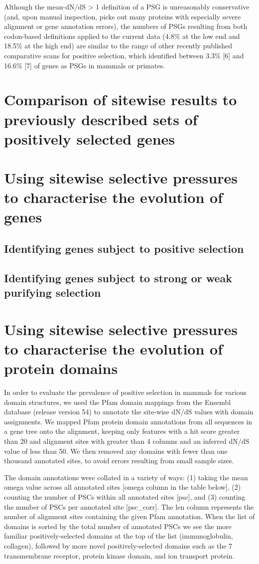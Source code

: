Although the mean-dN/dS > 1 definition of a PSG is unreasonably
conservative (and, upon manual inspection, picks out many proteins
with especially severe alignment or gene annotation errors), the
numbers of PSGs resulting from both codon-based definitions applied to
the current data (4.8\% at the low end and 18.5\% at the high end) are
similar to the range of other recently published comparative scans for
positive selection, which identified between 3.3\% [6] and 16.6\% [7]
of genes as PSGs in mammals or primates.


\section{Comparison of sitewise results to previously described sets of positively selected genes}

\section{Using sitewise selective pressures to characterise the evolution of genes}
\subsection{Identifying genes subject to positive selection}
\subsection{Identifying genes subject to strong or weak purifying selection}

\section{Using sitewise selective pressures to characterise the evolution of protein domains}

In order to evaluate the prevalence of positive selection in mammals
for various domain structures, we used the Pfam domain mappings from
the Ensembl database (release version 54) to annotate the site-wise
dN/dS values with domain assignments. We mapped Pfam protein domain
annotations from all sequences in a gene tree onto the alignment,
keeping only features with a hit score greater than 20 and alignment
sites with greater than 4 columns and an inferred dN/dS value of less
than 50. We then removed any domains with fewer than one thousand
annotated sites, to avoid errors resulting from small sample sizes.

The domain annotations were collated in a variety of ways: (1) taking
the mean omega value across all annotated sites [omega column in the
  table below], (2) counting the number of PSCs within all annotated
sites [psc], and (3) counting the number of PSCs per annotated site
[psc_corr]. The len column represents the number of alignment sites
containing the given Pfam annotation. When the list of domains is
sorted by the total number of annotated PSCs we see the more familiar
positively-selected domains at the top of the list (immunoglobulin,
collagen), followed by more novel positively-selected domains such as
the 7 transmembrane receptor, protein kinase domain, and ion transport
protein.


